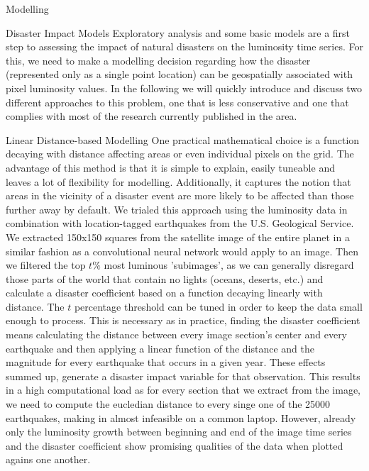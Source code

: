 \documentclass[12pt,fleqn,leqno,letterpaper]{article}
\begin{document}
\begin{section}{Modelling}
  \begin{subsection}{Disaster Impact Models}
    Exploratory analysis and some basic models are a first step to assessing the impact of natural disasters on the luminosity time series. For this, we need to make a modelling decision regarding how the disaster (represented only as a single point location) can be geospatially associated with pixel luminosity values. In the following we will quickly introduce and discuss two different approaches to this problem, one that is less conservative and one that complies with most of the research currently published in the area.
    \begin{subsubsection}{Linear Distance-based Modelling}
      One practical mathematical choice is a function decaying with distance affecting areas or even individual pixels on the grid. The advantage of this method is that it is simple to explain, easily tuneable and leaves a lot of flexibility for modelling. Additionally, it captures the notion that areas in the vicinity of a disaster event are more likely to be affected than those further away by default.
      We trialed this approach using the luminosity data in combination with location-tagged earthquakes from the U.S. Geological Service. We extracted 150x150 squares from the satellite image of the entire planet in a similar fashion as a convolutional neural network would apply to an image. Then we filtered the top $t\%$ most luminous 'subimages', as we can generally disregard those parts of the world that contain no lights (oceans, deserts, etc.) and calculate a disaster coefficient based on a function decaying linearly with distance. The $t$ percentage threshold can be tuned in order to keep the data small enough to process. This is necessary as in practice, finding the disaster coefficient means calculating the distance between every image section's center and every earthquake and then applying a linear function of the distance and the magnitude for every earthquake that occurs in a given year. These effects summed up, generate a disaster impact variable for that observation. This results in a high computational load as for every section that we extract from the image, we need to compute the eucledian distance to every singe one of the 25000 earthquakes, making in almost infeasible on a common laptop. However, already only the luminosity growth between beginning and end of the image time series and the disaster coefficient show promising qualities of the data when plotted agains one another.

\end{subsubsection}
\end{subsection}
\end{section}
\end{document}
